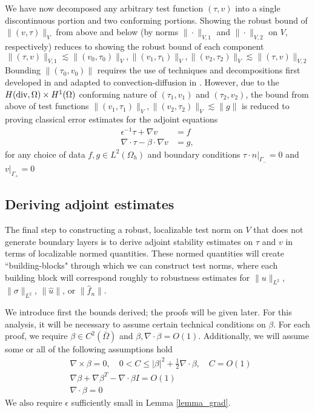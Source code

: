 \documentclass[11pt,onecolumn]{scrartcl}
\newcommand{\grad}{\nabla}
\newcommand{\curl}{\grad \times}
\renewcommand{\div}{\grad \cdot}
\begin{document}
We have now decomposed any arbitrary test function $\left(\tau,v\right)$ into a single discontinuous portion and two conforming portions.  Showing the robust bound of $\|\left(v,\tau\right)\|_V$ from above and below (by norms $\|\cdot \|_{V,1}$ and $\|\cdot \|_{V,2}$ on $V$, respectively) reduces to showing the robust bound of each component 
\[
\|\left(\tau,v\right)\|_{V,1} \lesssim \|\left(v_{0},\tau_{0}\right)\|_V, \|\left(v_{1},\tau_{1}\right)\|_V, \|\left(v_{2},\tau_{2}\right)\|_V \lesssim \|\left(\tau,v\right)\|_{V,2}
\]
Bounding $\|\left(\tau_0,v_0\right)\|$ requires the use of techniques and decompositions first developed in \cite{analysisDPG} and adapted to convection-diffusion in \cite{DPGrobustness}.  However, due to the $H({\rm div}, \Omega)\times H^1(\Omega)$ conforming nature of $\left(\tau_1,v_1\right)$ and $\left(\tau_2,v_2\right)$, the bound from above of test functions $\|\left(v_{1},\tau_{1}\right)\|_V, \|\left(v_{2},\tau_{2}\right)\|_V \lesssim \|g\|$ is reduced to proving classical error estimates for the adjoint equations
\begin{align}
\epsilon^{-1}\tau + \grad v &= f \label{adjoint1}\\
\div \tau - \beta\cdot \grad v &=  g, \label{adjoint2}
\end{align} 
for any choice of data $f, g\in L^2({\Omega_h})$ and boundary conditions $\left.\tau\cdot n\right|_{\Gamma_-} = 0$ and $\left.v\right|_{\Gamma_+} = 0$ 

\subsection{Deriving adjoint estimates}
\label{sec:strategy3}

The final step to constructing a robust, localizable test norm on $V$ that does not generate boundary layers is to derive adjoint stability estimates on $\tau$ and $v$ in terms of localizable normed quantities.  These normed quantities will create ``building-blocks" through which we can construct test norms, where each building block will correspond roughly to robustness estimates for $\|u\|_{L^2}$, $\|\sigma\|_{L^2}$, $\|\widehat{u}\|$, or $\|\widehat{f}_n\|$.  

We introduce first the bounds derived; the proofs will be given later. For this analysis, it will be necessary to assume certain technical conditions on $\beta$.  For each proof, we require $\beta \in C^2(\bar{\Omega})$ and $\beta, \div \beta = O(1)$.  Additionally, we will assume some or all of the following assumptions hold
\begin{align}
&\curl \beta = 0, \quad 0<C \leq \left | \beta\right |^2 + \frac{1}{2}\div \beta, \quad C = O(1) \label{a_req}\\
&\grad \beta + \grad \beta ^T - \div \beta I = O(1) \label{b_req}\\
&\div \beta = 0 \label{c_req}
\end{align}
We also require $\epsilon$ sufficiently small in Lemma \ref{lemma_grad}.  
\end{document}
